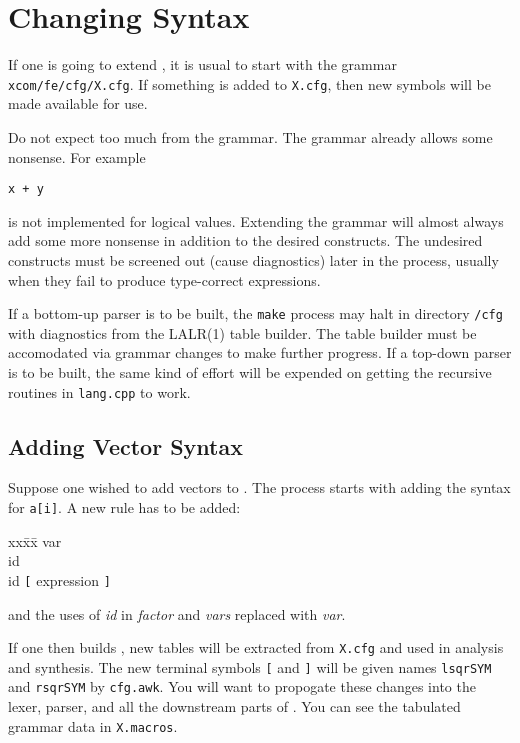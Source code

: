 \section{Changing  Syntax}

If one is going to extend , it is usual to start with the grammar {\tt xcom/fe/cfg/X.cfg}.  If something is added to {\tt X.cfg}, then new symbols will be made available for use.  

Do not expect too much from the grammar.  The grammar already allows some nonsense. For example

{\tt x + y}

\noindent
is not implemented for logical values.  Extending the grammar will almost always add some more nonsense in addition to the desired constructs.  The undesired constructs must be screened out (cause diagnostics) later in the process, usually when they fail to produce type-correct expressions.

If a bottom-up parser is to be built, the {\tt make} process may halt in directory {\tt /cfg} with diagnostics from the LALR(1) table builder.  The table builder must be accomodated via grammar changes to make further progress.  If a top-down parser is to be built, the same kind of effort will be expended on getting the recursive routines in {\tt lang.cpp} to work.

\subsection{Adding Vector Syntax}

Suppose one wished to add vectors to .  The process starts with adding the syntax for {\tt a[i]}.  A new rule has to be added:

\begin{center}
\begin{em}
\begin{tabbing}
xx\=xx\=\kill
\>var                           \\
\>\>id                          \\
\>\>id {\tt[} expression {\tt]}
\end{tabbing}
\end{em}
\end{center}

\noindent
and the uses of {\em id} in {\em factor} and {\em vars} replaced with {\em var}.

If one then builds \xcom, new tables will be extracted from {\tt X.cfg} and used in analysis and synthesis.  The new terminal symbols {\tt [} and {\tt ]} will be given names {\tt lsqrSYM} and {\tt rsqrSYM} by {\tt cfg.awk}.  You will want to propogate these changes into the lexer, parser, and all the downstream parts of \xcom.  You can see the tabulated grammar data in {\tt X.macros}.

